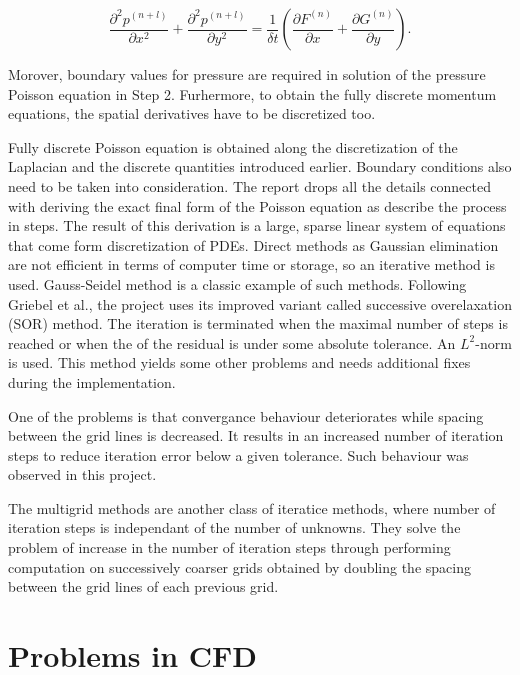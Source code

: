 \begin{equation} \label{eq:poisson}
	\frac{\partial^2 p^{(n+l)}}{\partial x^2}+\frac{\partial^2 p^{(n+l)}}{\partial y^2} = \frac{1}{\delta t} \left( \frac{\partial F^{(n)}}{\partial x} + \frac{\partial G^{(n)}}{\partial y} \right).
\end{equation}

Morover, boundary values for pressure are required in solution of the pressure Poisson equation in Step 2. Furhermore, to obtain the fully discrete momentum equations, the spatial derivatives have to be discretized too. 

Fully discrete Poisson equation is obtained along the discretization of the Laplacian and the discrete quantities introduced earlier. Boundary conditions also need to be taken into consideration. The report drops all the details connected with deriving the exact final form of the Poisson equation as \cite{griebel1998numerical} describe the process in steps. The result of this derivation is a large, sparse linear system of equations that come form discretization of PDEs. Direct methods as Gaussian elimination are not efficient in terms of computer time or storage, so an iterative method is used. Gauss-Seidel method is a classic example of such methods. Following Griebel et al., the project uses its improved variant called successive overelaxation (SOR) method. The iteration is terminated when the maximal number of steps is reached or when the of the residual is under some absolute tolerance. An $L^2$-norm is used. This method yields some other problems and needs additional fixes during the implementation.

One of the problems is that convergance behaviour deteriorates while spacing between the grid lines is decreased. It results in an increased number of iteration steps to reduce iteration error below a given tolerance. Such behaviour was observed in this project.

The multigrid methods are another class of iteratice methods, where number of iteration steps is independant of the number of unknowns. They solve the problem of increase in the number of iteration steps through performing computation on successively coarser grids obtained by doubling the spacing between the grid lines of each previous grid.

\section{Problems in CFD}


